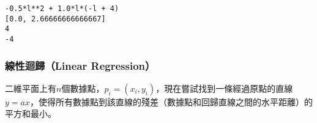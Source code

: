 \documentclass[11pt]{article}
\begin{document}
    \begin{Verbatim}[commandchars=\\\{\}]
-0.5*l**2 + 1.0*l*(-l + 4)
[0.0, 2.66666666666667]
4
-4

    \end{Verbatim}

    \hypertarget{ux7ddaux6027ux8ff4ux6b78linear-regression}{%
\subsubsection{線性迴歸（Linear
Regression）}\label{ux7ddaux6027ux8ff4ux6b78linear-regression}}

二維平面上有\(n\)個數據點，\(p_i = (x_i,y_i)\)，現在嘗試找到一條經過原點的直線\(y=ax\)，使得所有數據點到該直線的殘差（數據點和回歸直線之間的水平距離）的平方和最小。
\end{document}
